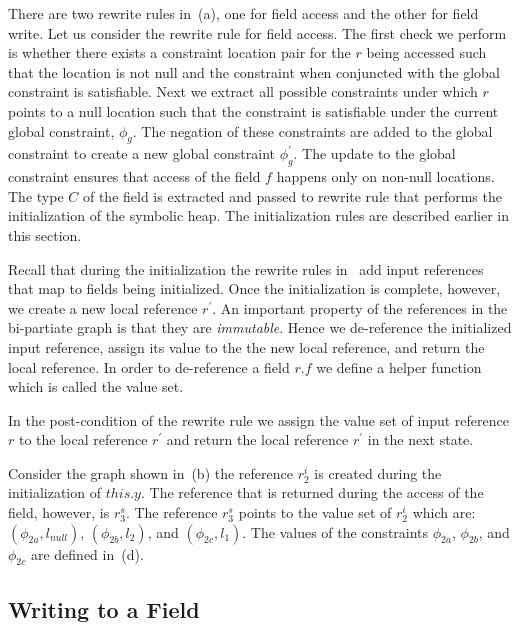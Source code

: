 There are two rewrite rules in~(a), one for field
access and the other for field write. Let us consider the rewrite rule
for field access. The first check we perform is whether there exists a
constraint location pair for the $r$ being accessed such that the
location is not null and the constraint when conjuncted with the
global constraint is satisfiable. Next we extract all possible
constraints under which $r$ points to a null location such that the
constraint is satisfiable under the current global constraint,
$\phi_g$. The negation of these constraints are added to the global
constraint to create a new global constraint $\phi_g^\prime$. The
update to the global constraint ensures that access of the field $f$
happens only on non-null locations. The type $C$ of the field is
extracted and passed to rewrite rule that performs the initialization
of the symbolic heap. The initialization rules are described earlier
in this section. 

Recall that during the initialization the rewrite rules
in~ add input references that map to fields being
initialized.  Once the initialization is complete, however, we create
a new local reference $r^\prime$. An important property of the
references in the bi-partiate graph is that they are
\emph{immutable}. Hence we de-reference the initialized input
reference, assign its value to the the new local reference, and return
the local reference. In order to de-reference a field $r.f$ we define
a helper function which is called the value set.



In the post-condition of the rewrite rule we assign
the value set of input reference $r$ to the local reference $r^\prime$
and return the local reference $r^\prime$ in the next state.

Consider the graph shown in~(b) the reference
$r_2^i$ is created during the initialization of $\mathit{this}.y$. The
reference that is returned during the access of the field, however, is
$r_3^s$. The reference $r_3^s$ points to the value set of $r_2^i$
which are: $(\phi_{2a}, l_\mathit{null})$, $(\phi_{2b}, l_2)$, and
$(\phi_{2c}, l_1)$. The values of the constraints $\phi_{2a}$,
$\phi_{2b}$, and $\phi_{2c}$ are defined in~(d).

\subsection{Writing to a Field}

